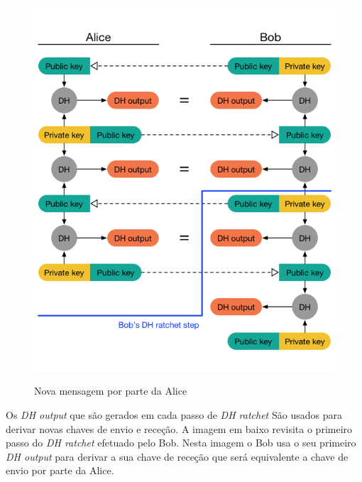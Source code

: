 \begin{figure}[H]
\begin{center}
\includegraphics[width=12cm]{img/DH4.png}
\label{diagram:DH4}
\caption{Nova mensagem por parte da Alice}
\centering
\end{center}
\end{figure}

Os \textit{DH output} que são gerados em cada passo de \textit{DH ratchet} São usados para derivar novas chaves de envio e receção. A imagem em baixo revisita o primeiro passo do \textit{DH ratchet} efetuado pelo Bob. Nesta imagem o Bob usa o seu primeiro \textit{DH output} para derivar a sua chave de receção que será equivalente a chave de envio por parte da Alice.

